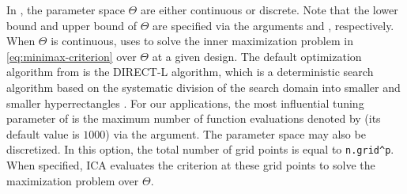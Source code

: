 In  , the parameter  space $\Theta$ are  either  continuous or discrete. Note that the lower bound and upper bound of $\Theta$  are specified via the arguments   and , respectively. When $\Theta$ is continuous,    uses     to solve the inner maximization problem  in \eqref{eq:minimax-criterion} over $\Theta$ at a given design.
The default optimization algorithm from  is
the DIRECT-L algorithm, which is  a deterministic search algorithm based on the systematic division of the search domain into smaller and smaller hyperrectangles \citep{directL2001}.
For our applications, the most influential tuning parameter of   is  the maximum number of function evaluations denoted by  (its default value  is $1000$) via the   argument.
The parameter space may also be discretized. In this option,  the total number of grid points is equal to \verb|n.grid^p|. When specified, ICA  evaluates the criterion  at these grid points
to  solve the maximization problem over $\Theta$.
